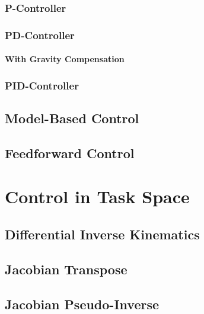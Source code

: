 			\subsubsection{P-Controller} %

			\subsubsection{PD-Controller} %

				\paragraph{With Gravity Compensation} %

			\subsubsection{PID-Controller} %

		\subsection{Model-Based Control} %

		\subsection{Feedforward Control} %

	\section{Control in Task Space} %

		\subsection{Differential Inverse Kinematics} %

		\subsection{Jacobian Transpose} %

		\subsection{Jacobian Pseudo-Inverse} %

